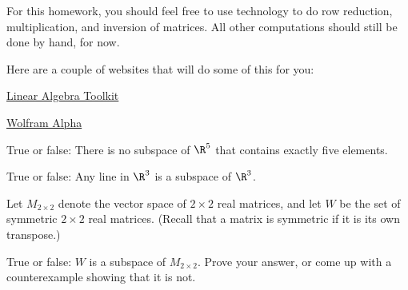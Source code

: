 




For this homework, you should feel free to use technology to do row reduction, multiplication, and inversion of matrices.  All other
computations should still be done by hand, for now.  

Here are a couple of websites that will do some of this for you:

\href{https://tinyurl.com/3xr6ed}{Linear Algebra Toolkit}

\href{https://www.wolframalpha.com/}{Wolfram Alpha}



\endedxtext


\endedxvertical




True or false: There is no subspace of $\R^5$ that contains exactly five elements.  


 
\endedxproblem


True or false: Any line in $\R^3$ is a subspace of $\R^3$.  


 
\endedxproblem



Let $M_{2\times 2}$ denote the vector space  of $2\times 2$ real matrices, and let $W$ be the 
set of symmetric $2\times 2$ real matrices.  (Recall that a matrix is symmetric if it is its own
transpose.)


True or false: $W$ is a subspace of $M_{2\times 2}$.  Prove your answer, or come up with a counterexample showing that it is not.  


